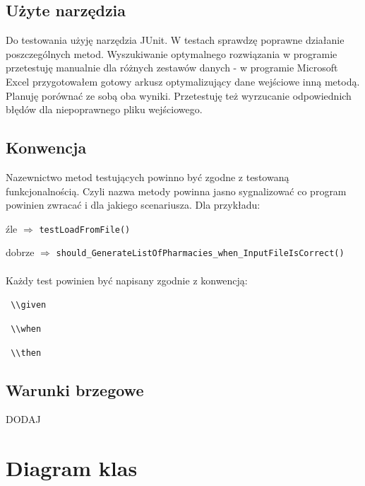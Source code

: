\documentclass[]{article}
\begin{document}
    \subsection{Użyte narzędzia}
    Do testowania użyję narzędzia JUnit. W testach sprawdzę poprawne działanie poszczególnych metod. Wyszukiwanie optymalnego rozwiązania w programie przetestuję manualnie dla różnych zestawów danych - w programie Microsoft Excel przygotowałem gotowy arkusz optymalizujący dane wejściowe inną metodą. Planuję porównać ze sobą oba wyniki. Przetestuję też wyrzucanie odpowiednich błędów dla niepoprawnego pliku wejściowego.

    \subsection{Konwencja}
    Nazewnictwo metod testujących powinno być zgodne z testowaną funkcjonalnością. Czyli nazwa metody powinna jasno sygnalizować co program powinien zwracać i dla jakiego scenariusza. Dla przykładu:
    
    źle $ \Rightarrow $ \verb|testLoadFromFile()|
    
    dobrze $ \Rightarrow $ \verb|should_GenerateListOfPharmacies_when_InputFileIsCorrect()|\\\\
    Każdy test powinien być napisany zgodnie z konwencją:
    
   \verb| \\given|
    
    \verb| \\when|
    
    \verb| \\then|

    \subsection{Warunki brzegowe}
    DODAJ


    \section{Diagram klas}

    \noindent
\end{document}
